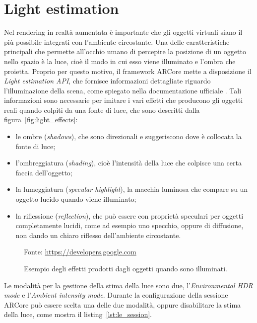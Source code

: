 \documentclass[crop=false, class=book]{standalone}
\begin{document}
	\section{Light estimation}
	Nel rendering in realtà aumentata è importante che gli oggetti virtuali siano il più possibile integrati con l'ambiente circostante. Una delle caratteristiche principali che permette all'occhio umano di percepire la posizione di un oggetto nello spazio è la luce, cioè il modo in cui esso viene illuminato e l'ombra che proietta. 
	Proprio per questo motivo, il framework ARCore mette a disposizione il \textit{Light estimation API}, che fornisce informazioni dettagliate riguardo l'illuminazione della scena, come spiegato nella documentazione ufficiale \cite{google2022light}.
	Tali informazioni sono necessarie per imitare i vari effetti che producono gli oggetti reali quando colpiti da una fonte di luce, che sono descritti dalla figura~\vref{fig:light_effects}:
	\begin{itemize}
		\item le ombre (\textit{shadows}), che sono direzionali e suggeriscono dove è collocata la fonte di luce;
		\item l'ombreggiatura (\textit{shading}), cioè l'intensità della luce che colpisce una certa faccia dell'oggetto;
		\item la lumeggiatura (\textit{specular highlight}), la macchia luminosa che compare su un oggetto lucido quando viene illuminato;
		\item la riflessione (\textit{reflection}), che può essere con proprietà speculari per oggetti completamente lucidi, come ad esempio uno specchio, oppure di diffusione, non dando un chiaro riflesso dell'ambiente circostante. 
	\end{itemize}
	
	\begin{figure}
		\centering
			{Fonte: \url{https://developers.google.com}}
		\caption{Esempio degli effetti prodotti dagli oggetti quando sono illuminati.}
		\label{fig:light_effects}
	\end{figure}
	Le modalità per la gestione della stima della luce sono due, l'\textit{Environmental HDR mode} e l'\textit{Ambient intensity mode}. Durante la configurazione della sessione ARCore può essere scelta una delle due modalità, oppure disabilitare la stima della luce, come mostra il listing~\vref{lst:le_session}.
	\\
	
\end{document}
